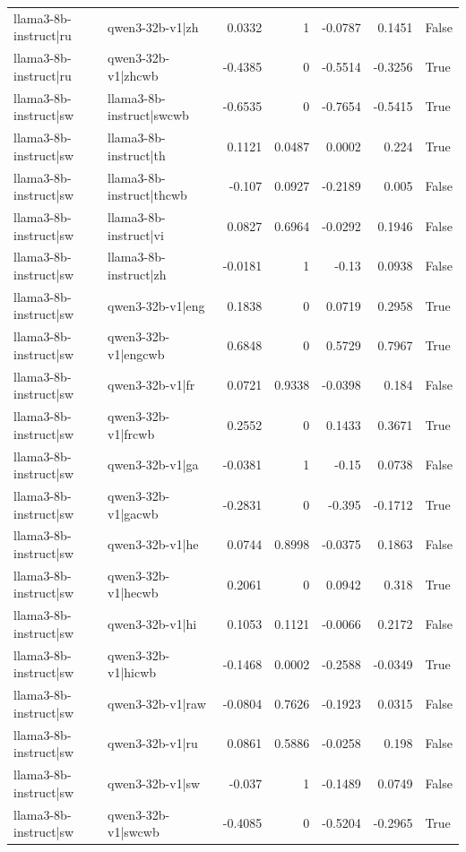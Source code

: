 \begin{table}
\begin{tabular}{l l r r r r l}
llama3-8b-instruct|ru & qwen3-32b-v1|zh & 0.0332 & 1 & -0.0787 & 0.1451 & False \\
llama3-8b-instruct|ru & qwen3-32b-v1|zhcwb & -0.4385 & 0 & -0.5514 & -0.3256 & True \\
llama3-8b-instruct|sw & llama3-8b-instruct|swcwb & -0.6535 & 0 & -0.7654 & -0.5415 & True \\
llama3-8b-instruct|sw & llama3-8b-instruct|th & 0.1121 & 0.0487 & 0.0002 & 0.224 & True \\
llama3-8b-instruct|sw & llama3-8b-instruct|thcwb & -0.107 & 0.0927 & -0.2189 & 0.005 & False \\
llama3-8b-instruct|sw & llama3-8b-instruct|vi & 0.0827 & 0.6964 & -0.0292 & 0.1946 & False \\
llama3-8b-instruct|sw & llama3-8b-instruct|zh & -0.0181 & 1 & -0.13 & 0.0938 & False \\
llama3-8b-instruct|sw & qwen3-32b-v1|eng & 0.1838 & 0 & 0.0719 & 0.2958 & True \\
llama3-8b-instruct|sw & qwen3-32b-v1|engcwb & 0.6848 & 0 & 0.5729 & 0.7967 & True \\
llama3-8b-instruct|sw & qwen3-32b-v1|fr & 0.0721 & 0.9338 & -0.0398 & 0.184 & False \\
llama3-8b-instruct|sw & qwen3-32b-v1|frcwb & 0.2552 & 0 & 0.1433 & 0.3671 & True \\
llama3-8b-instruct|sw & qwen3-32b-v1|ga & -0.0381 & 1 & -0.15 & 0.0738 & False \\
llama3-8b-instruct|sw & qwen3-32b-v1|gacwb & -0.2831 & 0 & -0.395 & -0.1712 & True \\
llama3-8b-instruct|sw & qwen3-32b-v1|he & 0.0744 & 0.8998 & -0.0375 & 0.1863 & False \\
llama3-8b-instruct|sw & qwen3-32b-v1|hecwb & 0.2061 & 0 & 0.0942 & 0.318 & True \\
llama3-8b-instruct|sw & qwen3-32b-v1|hi & 0.1053 & 0.1121 & -0.0066 & 0.2172 & False \\
llama3-8b-instruct|sw & qwen3-32b-v1|hicwb & -0.1468 & 0.0002 & -0.2588 & -0.0349 & True \\
llama3-8b-instruct|sw & qwen3-32b-v1|raw & -0.0804 & 0.7626 & -0.1923 & 0.0315 & False \\
llama3-8b-instruct|sw & qwen3-32b-v1|ru & 0.0861 & 0.5886 & -0.0258 & 0.198 & False \\
llama3-8b-instruct|sw & qwen3-32b-v1|sw & -0.037 & 1 & -0.1489 & 0.0749 & False \\
llama3-8b-instruct|sw & qwen3-32b-v1|swcwb & -0.4085 & 0 & -0.5204 & -0.2965 & True \\

\end{tabular}
\end{table}
